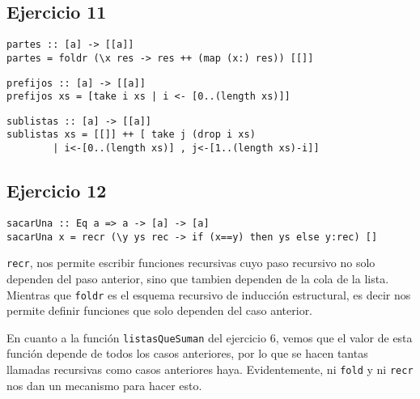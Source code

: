 \subsection{Ejercicio 11}

\begin{centrado}
	\begin{verbatim}
partes :: [a] -> [[a]]
partes = foldr (\x res -> res ++ (map (x:) res)) [[]]
	\end{verbatim}
\end{centrado}

\begin{centrado}
	\begin{verbatim}
prefijos :: [a] -> [[a]]
prefijos xs = [take i xs | i <- [0..(length xs)]]
	\end{verbatim}
\end{centrado}

\begin{centrado}
	\begin{verbatim}
sublistas :: [a] -> [[a]]
sublistas xs = [[]] ++ [ take j (drop i xs)  
		| i<-[0..(length xs)] , j<-[1..(length xs)-i]]
	\end{verbatim}
\end{centrado}


\subsection{Ejercicio 12}
\begin{centrado}
	\begin{verbatim}
sacarUna :: Eq a => a -> [a] -> [a]
sacarUna x = recr (\y ys rec -> if (x==y) then ys else y:rec) []
	\end{verbatim}
\end{centrado}

\texttt{recr}, nos permite escribir funciones recursivas cuyo paso recursivo no solo dependen del paso anterior, sino que tambien dependen de la cola de la lista. Mientras que \texttt{foldr} es el esquema recursivo de inducción estructural, es decir nos permite definir funciones que solo dependen del caso anterior.

En cuanto a la función \texttt{listasQueSuman} del ejercicio 6, vemos que el valor de esta función depende de todos los casos anteriores, por lo que se hacen tantas llamadas recursivas como casos anteriores haya. Evidentemente, ni \texttt{fold} y ni \texttt{recr} nos dan un mecanismo para hacer esto.


